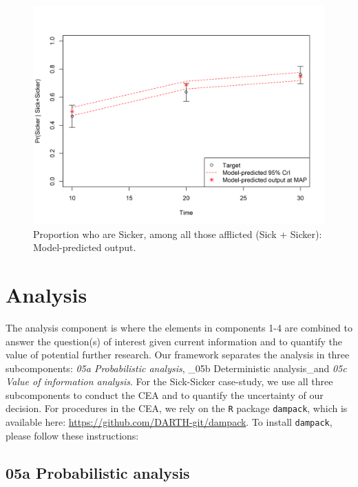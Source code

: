 \documentclass[]{book}
\begin{document}
\begin{figure}

{\centering \includegraphics[width=1\linewidth]{../figs/04_posterior_vs_targets_proportion_sicker} 

}

\caption{Proportion who are Sicker, among all those afflicted (Sick + Sicker): Model-predicted output.}\label{fig:04-proportion}
\end{figure}

\chapter{Analysis}\label{analysis}

The analysis component is where the elements in components 1-4 are
combined to answer the question(s) of interest given current information
and to quantify the value of potential further research. Our framework
separates the analysis in three subcomponents: \emph{05a Probabilistic
analysis}, \_05b Deterministic analysis\_and \emph{05c Value of
information analysis}. For the Sick-Sicker case-study, we use all three
subcomponents to conduct the CEA and to quantify the uncertainty of our
decision. For procedures in the CEA, we rely on the \texttt{R} package
\texttt{dampack}, which is available here:
\url{https://github.com/DARTH-git/dampack}. To install \texttt{dampack},
please follow these instructions:

\section{05a Probabilistic analysis}\label{Probabilistic-analysis}
\end{document}
